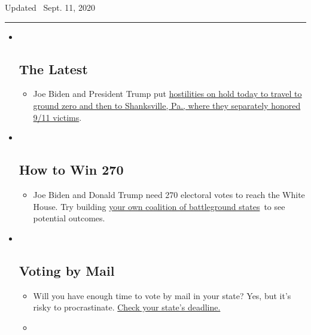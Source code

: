 Updated ~Sept. 11, 2020

\begin{center}\rule{0.5\linewidth}{\linethickness}\end{center}

\begin{itemize}
\item ~
  \hypertarget{the-latest}{%
  \subsection{The Latest}\label{the-latest}}

  \begin{itemize}
  \item
    Joe Biden and President Trump put
    \href{https://www.nytimes3xbfgragh.onion/2020/09/11/us/politics/shanksville-trump-biden.html}{hostilities
    on hold today to travel to ground zero and then to Shanksville, Pa.,
    where they separately honored 9/11 victims}.
  \end{itemize}
\item ~
  \hypertarget{how-to-win-270}{%
  \subsection{How to Win 270}\label{how-to-win-270}}

  \begin{itemize}
  \item
    Joe Biden and Donald Trump need 270 electoral votes to reach the
    White House. Try building
    \href{https://www.nytimes3xbfgragh.onion/interactive/2020/us/elections/election-states-biden-trump.html}{your
    own coalition of battleground states}~to see potential outcomes.
  \end{itemize}
\item ~
  \hypertarget{voting-by-mail}{%
  \subsection{Voting by Mail}\label{voting-by-mail}}

  \begin{itemize}
  \item
    Will you have enough time to vote by mail in your state? Yes, but
    it's risky to procrastinate.
    \href{https://www.nytimes3xbfgragh.onion/interactive/2020/08/31/us/politics/vote-by-mail-deadlines.html}{Check
    your state's deadline.}
  \item
    \href{https://www.nytimes3xbfgragh.onion/interactive/2020/us/elections/joe-biden.html}{}


\end{itemize}
\end{itemize}
